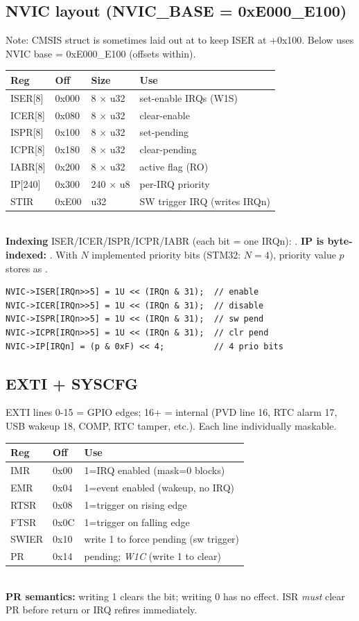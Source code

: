 \subsection{NVIC layout (NVIC\_BASE = 0xE000\_E100)}
Note: CMSIS  struct is sometimes laid out at  to keep ISER at +0x100. Below uses NVIC base = 0xE000\_E100 (offsets within).
\begin{tabular}{@{}llll@{}}
\toprule
\textbf{Reg} & \textbf{Off} & \textbf{Size} & \textbf{Use}\\
\midrule
ISER[8] & 0x000 & 8 $\times$ u32 & set-enable IRQs (W1S)\\
ICER[8] & 0x080 & 8 $\times$ u32 & clear-enable\\
ISPR[8] & 0x100 & 8 $\times$ u32 & set-pending\\
ICPR[8] & 0x180 & 8 $\times$ u32 & clear-pending\\
IABR[8] & 0x200 & 8 $\times$ u32 & active flag (RO)\\
IP[240] & 0x300 & 240 $\times$ u8 & per-IRQ priority\\
STIR    & 0xE00 & u32 & SW trigger IRQ (writes IRQn)\\
\bottomrule
\end{tabular}\\
\textbf{Indexing} ISER/ICER/ISPR/ICPR/IABR (each bit = one IRQn): . \textbf{IP is byte-indexed:} . With $N$ implemented priority bits (STM32: $N=4$), priority value $p$ stores as .
\begin{lstlisting}[language={}]
NVIC->ISER[IRQn>>5] = 1U << (IRQn & 31);  // enable
NVIC->ICER[IRQn>>5] = 1U << (IRQn & 31);  // disable
NVIC->ISPR[IRQn>>5] = 1U << (IRQn & 31);  // sw pend
NVIC->ICPR[IRQn>>5] = 1U << (IRQn & 31);  // clr pend
NVIC->IP[IRQn] = (p & 0xF) << 4;          // 4 prio bits
\end{lstlisting}

\subsection{EXTI + SYSCFG}
EXTI lines 0-15 = GPIO edges; 16+ = internal (PVD line 16, RTC alarm 17, USB wakeup 18, COMP, RTC tamper, etc.). Each line individually maskable.
\begin{tabular}{@{}lll@{}}
\toprule
\textbf{Reg} & \textbf{Off} & \textbf{Use}\\
\midrule
IMR    & 0x00 & 1=IRQ enabled (mask=0 blocks)\\
EMR    & 0x04 & 1=event enabled (wakeup, no IRQ)\\
RTSR   & 0x08 & 1=trigger on rising edge\\
FTSR   & 0x0C & 1=trigger on falling edge\\
SWIER  & 0x10 & write 1 to force pending (sw trigger)\\
PR     & 0x14 & pending; \emph{W1C} (write 1 to clear)\\
\bottomrule
\end{tabular}\\
\textbf{PR semantics:} writing 1 clears the bit; writing 0 has no effect. ISR \emph{must} clear PR before return or IRQ refires immediately.

